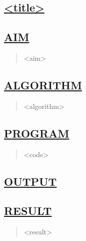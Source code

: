 \documentclass[a4paper, 12pt]{article}
\begin{document}
\newpage
\begin{center}
\section*{\LARGE \textbf{\underline{<title>}}} %
\end{center}

\subsection*{\underline{AIM}}
\begin{quote}
<aim>
\end{quote}

\subsection*{\underline{ALGORITHM}}
\begin{quote}
<algorithm>
\end{quote}

\subsection*{\underline{PROGRAM}}
\begin{quote}
<code>
\end{quote}


\subsection*{\underline{OUTPUT}}

\begin{figure}[H] 
    \centering
\end{figure}


\subsection*{\underline{RESULT}}
\begin{quote}
<result>
\end{quote}
\end{document}
